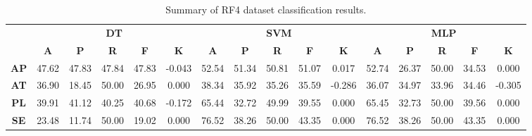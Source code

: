 \begin{landscape}
\begin{table}[htbp]
\footnotesize
\centering
\caption{Summary of RF4 dataset classification results.}
\label{tab:base_female}
\begin{tabular}{|c|c|c|c|c|c|c|c|c|c|c|c|c|c|c|c|}
\hline
\multirow{2}{*}{}	& \multicolumn{5}{c|}{\textbf{DT}}												& \multicolumn{5}{c|}{\textbf{SVM}}												& \multicolumn{5}{c|}{\textbf{MLP}}												\\ \cline{2-16} 
					& \textbf{A}	& \textbf{P}	& \textbf{R}	& \textbf{F}	& \textbf{K}	& \textbf{A}	& \textbf{P}	& \textbf{R}	& \textbf{F}	& \textbf{K}	& \textbf{A}	& \textbf{P}	& \textbf{R}	& \textbf{F}	& \textbf{K}	\\ \hline
\textbf{AP}			& 47.62			& 47.83			& 47.84			& 47.83			& -0.043			& 52.54			& 51.34			& 50.81			& 51.07			& 0.017			& 52.74			& 26.37			& 50.00			& 34.53			& 0.000			\\ \hline
\textbf{AT}			& 36.90			& 18.45			& 50.00			& 26.95			& 0.000			& 38.34			& 35.92			& 35.26			& 35.59			& -0.286			& 36.07			& 34.97			& 33.96			& 34.46			& -0.305			\\ \hline
\textbf{PL}			& 39.91			& 41.12			& 40.25			& 40.68			& -0.172			& 65.44			& 32.72			& 49.99			& 39.55			& 0.000			& 65.45			& 32.73			& 50.00			& 39.56			& 0.000			\\ \hline
\textbf{SE}			& 23.48			& 11.74			& 50.00			& 19.02			& 0.000			& 76.52			& 38.26			& 50.00			& 43.35			& 0.000			& 76.52			& 38.26			& 50.00			& 43.35			& 0.000			\\ \hline
\end{tabular}
\end{table}
\end{landscape}